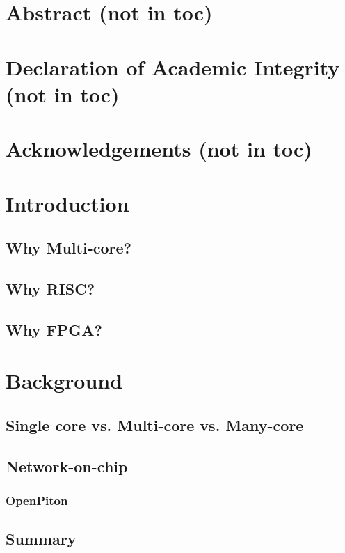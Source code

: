 \documentclass[11pt,a4paper,twoside]{report}
\begin{document}
\vspace{1cm}
\cite{openpiton}
\cite{satish2009designing}
\cite{binet2010harnessing}

\newpage

\chapter{Abstract (not in toc)}
\chapter{Declaration of Academic Integrity (not in toc)}
\chapter{Acknowledgements (not in toc)}

\chapter{Introduction}
    \section{Why Multi-core?}
    \section{Why RISC?}
    \section{Why FPGA?}
    
\chapter{Background}
    \section{Single core vs. Multi-core vs. Many-core}
    \section{Network-on-chip}
        \subsection{OpenPiton}
    \section{Summary}
    
\end{document}
